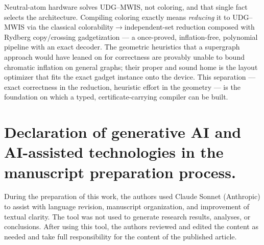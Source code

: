 \documentclass[11pt]{article}
\theoremstyle{definition}
\theoremstyle{remark}
\begin{document}
Neutral-atom hardware solves UDG--MWIS, not coloring, and that single fact selects
the architecture. Compiling coloring exactly means \emph{reducing} it to UDG--MWIS
via the classical colorability$\to$independent-set reduction composed with Rydberg
copy/crossing gadgetization --- a once-proved, inflation-free, polynomial pipeline
with an exact decoder. The geometric heuristics that a supergraph approach would
have leaned on for correctness are provably unable to bound chromatic inflation on
general graphs; their proper and sound home is the layout optimizer that fits the
exact gadget instance onto the device. This separation --- exact correctness in the
reduction, heuristic effort in the geometry --- is the foundation on which a typed,
certificate-carrying compiler can be built.

\section*{Declaration of generative AI and AI-assisted technologies in the manuscript preparation process.}
During the preparation of this work, the authors used Claude Sonnet (Anthropic) to
assist with language revision, manuscript organization, and improvement of textual
clarity. The tool was not used to generate research results, analyses, or
conclusions. After using this tool, the authors reviewed and edited the content as
needed and take full responsibility for the content of the published article.



\end{document}
